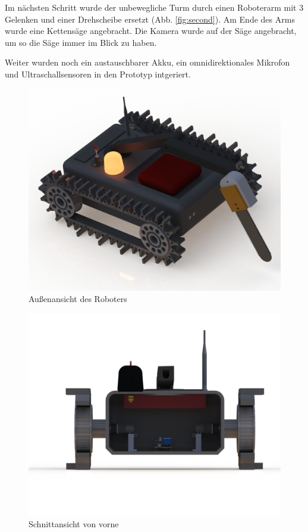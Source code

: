 Im nächsten Schritt wurde der unbewegliche Turm durch einen Roboterarm mit 3 Gelenken und einer Drehscheibe ersetzt (Abb. \ref{fig:second}). Am Ende des Arms wurde eine Kettensäge angebracht. Die Kamera wurde auf der Säge angebracht, um so die Säge immer im Blick zu haben.

Weiter wurden noch ein austauschbarer Akku, ein omnidirektionales Mikrofon und Ultraschallsensoren in den Prototyp intgeriert.
\begin{figure}[h]
    \centering
    \captionsetup{width=.9\linewidth}
    \includegraphics[width=1\linewidth]{trimetrisch_vorne_rechts_oben.JPG}
    \caption{Außenansicht des Roboters}
    \label{fig:final}
\end{figure}
\begin{figure}[h]
    \centering
    \captionsetup{width=.9\linewidth}
    \includegraphics[width=1\linewidth]{schnitt_front.JPG}
    \caption{Schnittansicht von vorne}
    \label{fig:front}
\end{figure}
